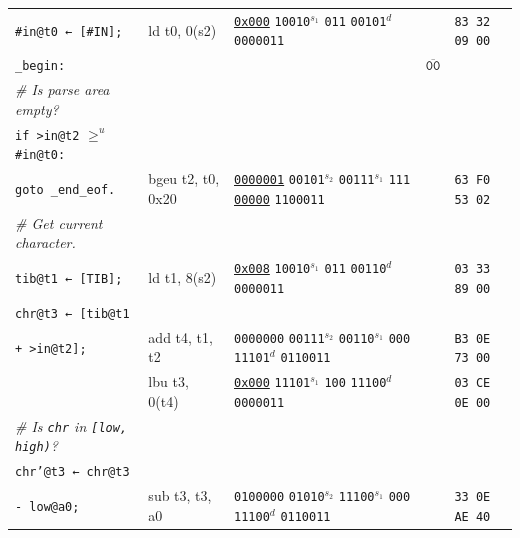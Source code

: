 \documentclass[a4paper,12pt,final]{article}
\begin{document}
\begin{table}[!htbp]
\begin{adjustwidth}{-1cm}{-1cm}
\begin{center}
\begin{tabular}{l|ll|l|l}
\hspace{1.053000em} \texttt{\#in@t0 ← [\#IN];} & ld t0, 0(s2) & \uline{\texttt{0x000}}                    \texttt{10010}​\(^{s_{1}}\) \texttt{011} \texttt{00101}​\(^{d}\)  \texttt{0000011} &  & \texttt{83 32 09 00}\\[0pt]
\texttt{\_begin:} &  &  & \(\overline{\texttt{00}}\) & \\[0pt]
\hspace{1.053000em} \emph{\# Is parse area empty?} &  &  &  & \\[0pt]
\hspace{1.053000em} \texttt{if >in@t2} \(\ge ^{u}\) \texttt{\#in@t0:} &  &  &  & \\[0pt]
\hspace{2.106000em}   \texttt{goto \_end\_eof.} & bgeu t2, t0, 0x20 & \uline{\texttt{0000001}} \texttt{00101}​\(^{s_{2}}\) \texttt{00111}​\(^{s_{1}}\) \texttt{111} \uline{\texttt{00000}} \texttt{1100011} &  & \texttt{63 F0 53 02}\\[0pt]
\hspace{1.053000em} \emph{\# Get current character.} &  &  &  & \\[0pt]
\hspace{1.053000em} \texttt{tib@t1 ← [TIB];} & ld t1, 8(s2) & \uline{\texttt{0x008}}                    \texttt{10010}​\(^{s_{1}}\) \texttt{011} \texttt{00110}​\(^{d}\)  \texttt{0000011} &  & \texttt{03 33 89 00}\\[0pt]
\hspace{1.053000em} \texttt{chr@t3 ← [tib@t1} &  &  &  & \\[0pt]
\hspace{5.265000em}        \texttt{+ >in@t2];} & add t4, t1, t2 & \texttt{0000000} \texttt{00111}​\(^{s_{2}}\) \texttt{00110}​\(^{s_{1}}\) \texttt{000} \texttt{11101}​\(^{d}\)  \texttt{0110011} &  & \texttt{B3 0E 73 00}\\[0pt]
\hspace{1.053000em} & lbu t3, 0(t4) & \uline{\texttt{0x000}}                    \texttt{11101}​\(^{s_{1}}\) \texttt{100} \texttt{11100}​\(^{d}\)  \texttt{0000011} &  & \texttt{03 CE 0E 00}\\[0pt]
\hspace{1.053000em} \emph{\# Is \texttt{chr} in \texttt{[low, high)}?} &  &  &  & \\[0pt]
\hspace{1.053000em} \texttt{chr'@t3 ← chr@t3} &  &  &  & \\[0pt]
\hspace{5.265000em}        \texttt{- low@a0;} & sub t3, t3, a0 & \texttt{0100000} \texttt{01010}​\(^{s_{2}}\) \texttt{11100}​\(^{s_{1}}\) \texttt{000} \texttt{11100}​\(^{d}\)  \texttt{0110011} &  & \texttt{33 0E AE 40}\\[0pt]

\end{tabular}
\end{center}
\end{adjustwidth}
\end{table}
\end{document}
